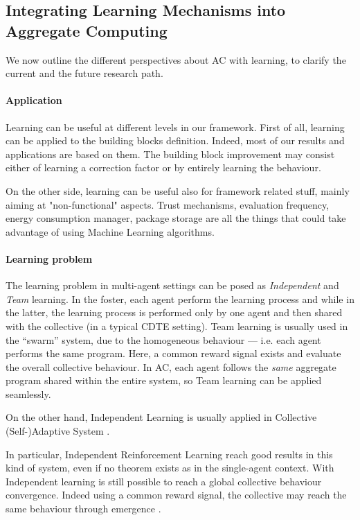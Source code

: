 \documentclass[conference]{IEEEtran}
\begin{document}
\subsection{Integrating Learning Mechanisms into Aggregate Computing}
We now outline the different perspectives about AC with learning, 
 to clarify the current and the future research path.
%
\paragraph{Application} Learning can be useful at different levels in our framework.
 First of all, learning can be applied to the building blocks definition.
% 
Indeed, most of our results and applications are based on them.
%
The building block improvement may consist either of learning a correction factor or by entirely learning the behaviour.

On the other side, learning can be useful also for framework related stuff,
 mainly aiming at "non-functional" aspects. 
 Trust mechanisms, evaluation frequency, energy consumption manager, package storage are all the things that could take advantage of using Machine Learning algorithms.
 
\paragraph{Learning problem} 
The learning problem in multi-agent settings can be posed as \textit{Independent} and \textit{Team} learning. 
In the foster, each agent perform the learning process and while in the latter,
 the learning process is performed only by one agent and then shared with the collective (in a typical CDTE setting).
% 
Team learning is usually used in the ``swarm'' system, due to the homogeneous behaviour 
 --- i.e. each agent performs the same program. 
 Here, a common reward signal exists and evaluate the overall collective behaviour.
% 
In AC, each agent follows the \textit{same} aggregate program shared within the entire system, so Team learning can 
 be applied seamlessly.

On the other hand, Independent Learning is usually applied in Collective
 (Self-)Adaptive System \cite{csas-and-marl}.

In particular, Independent Reinforcement Learning reach good results in this kind of system, 
 even if no theorem exists as in the single-agent context.
%
With Independent learning is still possible to reach a global collective behaviour convergence. 
 Indeed using a common reward signal, the collective may reach the same behaviour through emergence \cite{iima2008swarm, nguyen2018swarm}.
\end{document}
